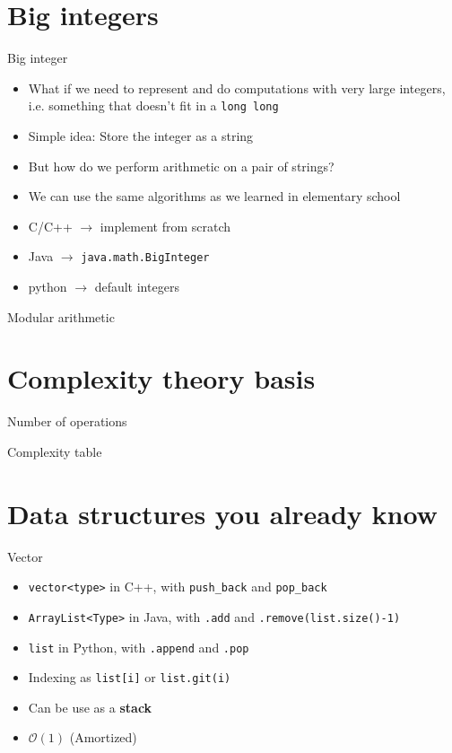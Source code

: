 \documentclass{beamer}
\begin{document}
\section{Big integers}
\begin{frame}{Big integer}
  \begin{itemize}
  \item What if we need to represent and do computations with very large integers,
    i.e. something that doesn't fit in a \texttt{long long}
    \pause
  \item Simple idea: Store the integer as a string
    \pause
  \item But how do we perform arithmetic on a pair of strings?
  \item We can use the same algorithms as we learned in elementary school
    \pause
  \item C/C++ $\to$ implement from scratch
  \item Java $\to$ \texttt{java.math.BigInteger}
  \item python $\to$ default integers
  \end{itemize}
\end{frame}

\begin{frame}{Modular arithmetic}
\end{frame}

\section{Complexity theory basis}
\begin{frame}{Number of operations}
\end{frame}

\begin{frame}{Complexity table}
\end{frame}

\section{Data structures you already know}
\begin{frame}{Vector}
  \begin{itemize}
  \item \texttt{vector<type>} in C++, with \texttt{push\_back} and \texttt{pop\_back}
  \item \texttt{ArrayList<Type>} in Java, with \texttt{.add} and \texttt{.remove(list.size()-1)}
  \item \texttt{list} in Python, with \texttt{.append} and \texttt{.pop}
  \item Indexing as \texttt{list[i]} or \texttt{list.git(i)}
  \item Can be use as a \textbf{stack}
  \item $\mathcal{O}(1)$ (Amortized)
\end{itemize}
\end{frame}
\end{document}

